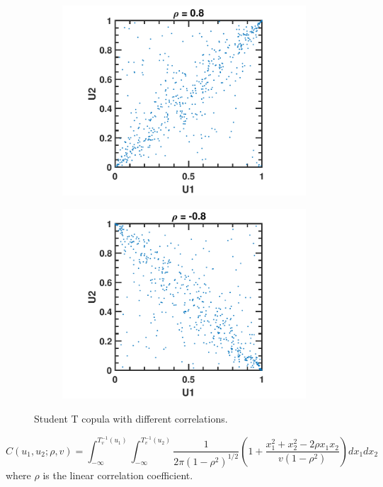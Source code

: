 \begin{refsection}
\begin{figure}[H]
\begin{subfigure}[b]{0.42\textwidth}
		\includegraphics[width=\textwidth]{figures/statisticalModeling/StudentTCopulaDemo3}
		
	\end{subfigure}
	\begin{subfigure}[b]{0.42\textwidth}
		\includegraphics[width=\textwidth]{figures/statisticalModeling/StudentTCopulaDemo4}
		
	\end{subfigure}
	\caption{Student T copula with different correlations.}
	
\end{figure}


\begin{example}
	$$C(u_1,u_2;\rho,v) = \int_{-\infty}^{T^{-1}_v(u_1)}\int_{-\infty}^{T^{-1}_v(u_2)}\frac{1}{2\pi(1-\rho^2)^{1/2}}(1 + \frac{x_1^2+x_2^2-2\rho x_1x_2}{v(1-\rho^2)})dx_1dx_2$$
	where $\rho$ is the linear correlation coefficient.
\end{example}


\end{refsection}
